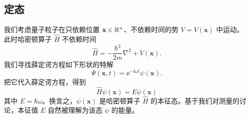 \subsection{定态}

我们考虑量子粒子在只依赖位置 $\mathbf x\in\mathbb{R}^n$、不依赖时间的势 $V=V(\mathbf x)$ 中运动。此时哈密顿算子 $\hat H$ 不依赖时间
\[
\hat H=-\frac{\hbar^2}{2m}\nabla^2+V(\mathbf x).
\]
我们寻找薛定谔方程如下形状的特解
\[
\Psi(\mathbf x,t)=\ee^{-\ii\omega t}\psi(\mathbf x).
\]
把它代入薛定谔方程，得到
\[
\hat H\psi(\mathbf x)=E\psi(\mathbf x) \tag{$*$}
\]
其中 $E=\hbar\omega$。换言之，$\psi(\mathbf x)$ 是哈密顿算子 $\hat H$ 的本征态。基于我们对测量的讨论，本征值 $E$ 自然被理解为该态 $\psi$ 的能量。



